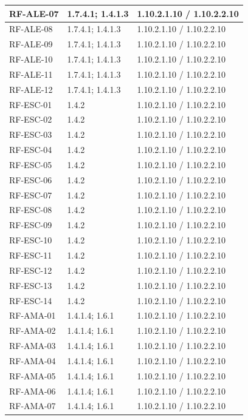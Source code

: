 \begin{longtable}{L{23mm}L{46mm}L{72mm}}
RF-ALE-07 & 1.7.4.1; 1.4.1.3 & 1.10.2.1.10 / 1.10.2.2.10\\\hline
RF-ALE-08 & 1.7.4.1; 1.4.1.3 & 1.10.2.1.10 / 1.10.2.2.10\\\hline
RF-ALE-09 & 1.7.4.1; 1.4.1.3 & 1.10.2.1.10 / 1.10.2.2.10\\\hline
RF-ALE-10 & 1.7.4.1; 1.4.1.3 & 1.10.2.1.10 / 1.10.2.2.10\\\hline
RF-ALE-11 & 1.7.4.1; 1.4.1.3 & 1.10.2.1.10 / 1.10.2.2.10\\\hline
RF-ALE-12 & 1.7.4.1; 1.4.1.3 & 1.10.2.1.10 / 1.10.2.2.10\\\hline
RF-ESC-01 & 1.4.2 & 1.10.2.1.10 / 1.10.2.2.10\\\hline
RF-ESC-02 & 1.4.2 & 1.10.2.1.10 / 1.10.2.2.10\\\hline
RF-ESC-03 & 1.4.2 & 1.10.2.1.10 / 1.10.2.2.10\\\hline
RF-ESC-04 & 1.4.2 & 1.10.2.1.10 / 1.10.2.2.10\\\hline
RF-ESC-05 & 1.4.2 & 1.10.2.1.10 / 1.10.2.2.10\\\hline
RF-ESC-06 & 1.4.2 & 1.10.2.1.10 / 1.10.2.2.10\\\hline
RF-ESC-07 & 1.4.2 & 1.10.2.1.10 / 1.10.2.2.10\\\hline
RF-ESC-08 & 1.4.2 & 1.10.2.1.10 / 1.10.2.2.10\\\hline
RF-ESC-09 & 1.4.2 & 1.10.2.1.10 / 1.10.2.2.10\\\hline
RF-ESC-10 & 1.4.2 & 1.10.2.1.10 / 1.10.2.2.10\\\hline
RF-ESC-11 & 1.4.2 & 1.10.2.1.10 / 1.10.2.2.10\\\hline
RF-ESC-12 & 1.4.2 & 1.10.2.1.10 / 1.10.2.2.10\\\hline
RF-ESC-13 & 1.4.2 & 1.10.2.1.10 / 1.10.2.2.10\\\hline
RF-ESC-14 & 1.4.2 & 1.10.2.1.10 / 1.10.2.2.10\\\hline
RF-AMA-01 & 1.4.1.4; 1.6.1 & 1.10.2.1.10 / 1.10.2.2.10\\\hline
RF-AMA-02 & 1.4.1.4; 1.6.1 & 1.10.2.1.10 / 1.10.2.2.10\\\hline
RF-AMA-03 & 1.4.1.4; 1.6.1 & 1.10.2.1.10 / 1.10.2.2.10\\\hline
RF-AMA-04 & 1.4.1.4; 1.6.1 & 1.10.2.1.10 / 1.10.2.2.10\\\hline
RF-AMA-05 & 1.4.1.4; 1.6.1 & 1.10.2.1.10 / 1.10.2.2.10\\\hline
RF-AMA-06 & 1.4.1.4; 1.6.1 & 1.10.2.1.10 / 1.10.2.2.10\\\hline
RF-AMA-07 & 1.4.1.4; 1.6.1 & 1.10.2.1.10 / 1.10.2.2.10\\\hline

\end{longtable}
